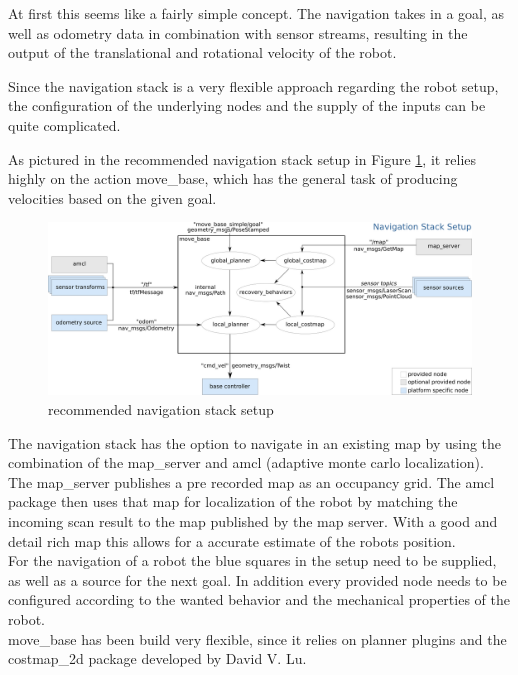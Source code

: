At first this seems like a fairly simple concept. The navigation takes in a goal, as well as odometry data in combination with sensor streams, resulting in the output of the translational and rotational velocity of the robot.

Since the navigation stack is a very flexible approach regarding the robot setup, the configuration of the underlying nodes and the supply of the inputs can be quite complicated\cite{nav}.

As pictured in the recommended navigation stack setup in Figure \ref{navigation stack setup}, it relies highly on the action move\_base, which has the general task of producing velocities based on the given goal.

\begin{figure}[H]
	\centering
	\includegraphics[width=\textwidth]{Pictures/navigation stack setup}
	\caption{recommended navigation stack setup\cite{movebase}}
	
	\label{navigation stack setup}
\end{figure}

The navigation stack has the option to navigate in an existing map by using the combination of the map\_server and amcl (adaptive monte carlo localization). The map\_server publishes a pre recorded map as an occupancy grid. The amcl package then uses that map for localization of the robot by matching the incoming scan result to the map published by the map server. With a good and detail rich map this allows for a accurate estimate of the robots position.\\

For the navigation of a robot the blue squares in the setup need to be supplied, as well as a source for the next goal. In addition every provided node needs to be configured according to the wanted behavior and the mechanical properties of the robot.\\

move\_base has been build very flexible, since it relies on planner plugins and the costmap\_2d package developed by David V. Lu.

